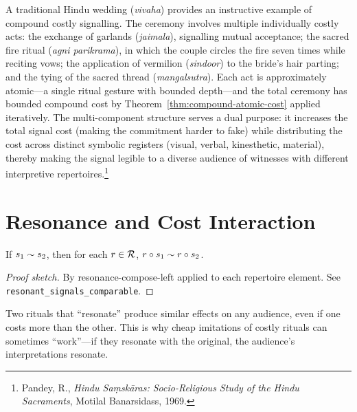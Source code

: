 \begin{example}
A traditional Hindu wedding (\textit{vivaha}) provides an instructive
example of compound costly signalling.  The ceremony involves multiple
individually costly acts: the exchange of garlands (\textit{jaimala}),
signalling mutual acceptance; the sacred fire ritual (\textit{agni
parikrama}), in which the couple circles the fire seven times while
reciting vows; the application of vermilion (\textit{sindoor}) to the
bride's hair parting; and the tying of the sacred thread
(\textit{mangalsutra}).  Each act is approximately atomic---a single
ritual gesture with bounded depth---and the total ceremony has bounded
compound cost by Theorem~\ref{thm:compound-atomic-cost} applied
iteratively.  The multi-component structure serves a dual purpose:
it increases the total signal cost (making the commitment harder to
fake) while distributing the cost across distinct symbolic registers
(visual, verbal, kinesthetic, material), thereby making the signal
legible to a diverse audience of witnesses with different interpretive
repertoires.\footnote{Pandey, R., \textit{Hindu Sa\d{m}sk\={a}ras:
  Socio-Religious Study of the Hindu Sacraments}, Motilal Banarsidass,
  1969.}
\end{example}

\section{Resonance and Cost Interaction}
\label{sec:ch3:resonance-cost}

\begin{theorem}
\label{thm:resonant-comparable}
If $s_1 \sim s_2$, then for each $r \in \mathcal{R}$,
$r \circ s_1 \sim r \circ s_2$.
\end{theorem}

\begin{proof}[Proof sketch]
By resonance-compose-left applied to each repertoire element.
See \texttt{resonant\_signals\_comparable}.
\end{proof}

\begin{remark}
Two rituals that ``resonate'' produce similar effects on any audience,
even if one costs more than the other.  This is why cheap imitations of
costly rituals can sometimes ``work''---if they resonate with the
original, the audience's interpretations resonate.
\end{remark}

